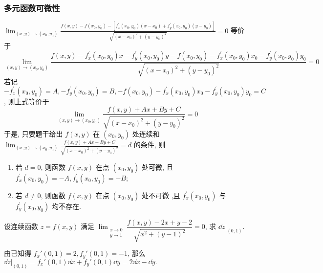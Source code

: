 \subsubsection{多元函数可微性}

$\displaystyle \lim _{(x, y) \to\left(x_{0}, y_{0}\right)} \frac{f(x, y)-f\left(x_{0}, y_{0}\right)-\left[f_{x}^{\prime}\left(x_{0}, y_{0}\right)\left(x-x_{0}\right)+f_{y}^{\prime}\left(x_{0}, y_{0}\right)\left(y-y_{0}\right)\right]}{\sqrt{\left(x-x_{0}\right)^{2}+\left(y-y_{0}\right)^{2}}}=0$ 等价于
$$
    \lim _{(x, y) \to\left(x_{0}, y_{0}\right)} \frac{f(x, y)-f_{x}^{\prime}\left(x_{0}, y_{0}\right) x-f_{y}^{\prime}\left(x_{0}, y_{0}\right) y-f\left(x_{0}, y_{0}\right)-f_{x}^{\prime}\left(x_{0}, y_{0}\right) x_{0}-f_{y}^{\prime}\left(x_{0}, y_{0}\right) y_{0}}{\sqrt{\left(x-x_{0}\right)^{2}+\left(y-y_{0}\right)^{2}}}=0
$$
若记 $ -f_{x}^{\prime}\left(x_{0}, y_{0}\right)=A ,-f_{y}^{\prime}\left(x_{0}, y_{0}\right)=B, -f\left(x_{0}, y_{0}\right)-f_{x}^{\prime}\left(x_{0}, y_{0}\right) x_{0}-f_{y}^{\prime}\left(x_{0}, y_{0}\right) y_{0}=C $, 则上式等价于
$$
    \lim _{(x, y) \to\left(x_{0}, y_{0}\right)} \frac{f(x, y)+A x+B y+C}{\sqrt{\left(x-x_{0}\right)^{2}+\left(y-y_{0}\right)^{2}}}=0
$$
于是, 只要题干给出 $ f(x, y) $ 在 $ \left(x_{0}, y_{0}\right) $ 处连续和 $\displaystyle  \lim _{(x, y) \to\left(x_{0}, y_{0}\right)} \frac{f(x, y)+A x+B y+C}{\sqrt{\left(x-x_{0}\right)^{2}+\left(y-y_{0}\right)^{2}}}=d $ 的条件, 则
\begin{enumerate}[label=(\arabic{*})]
    \item 若 $d=0$, 则函数 $f(x, y) $ 在点 $\left(x_{0}, y_{0}\right) $ 处可微, 且 $f_{x}^{\prime}\left(x_{0}, y_{0}\right)=-A, f_{y}^{\prime}\left(x_{0}, y_{0}\right)=-B$;
    \item 若 $ d \neq 0 $, 则函数 $ f(x, y) $ 在点 $ \left(x_{0}, y_{0}\right) $ 处不可微 ,且 $ f_{x}^{\prime}\left(x_{0}, y_{0}\right) $ 与 $ f_{y}^{\prime}\left(x_{0}, y_{0}\right) $ 均不存在.
\end{enumerate}

\begin{example}
    设连续函数 $z=f(x,y)$ 满足 $\displaystyle \lim_{\substack{x\to0\\ y\to1}}\dfrac{f(x,y)-2x+y-2}{\sqrt{x^2+(y-1)^2}}=0$, 求 $\dd z|_{(0,1)}.$
\end{example}
\begin{solution}
    由已知得 $f_x'(0,1)=2, f_y'(0,1)=-1$, 那么 $\dd z|_{(0,1)}=f_x'(0,1)\dd x+f_y'(0,1)\dd y=2\dd x-\dd y.$
\end{solution}

